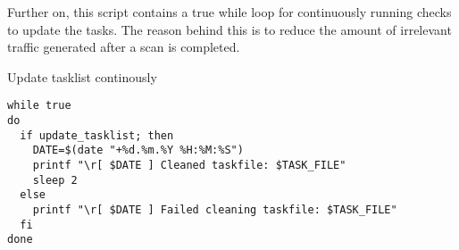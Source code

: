 Further on, this script contains a true while loop for continuously running checks to update the tasks.
The reason behind this is to reduce the amount of irrelevant traffic generated after a scan is completed.


\begin{listing}[!ht]
\caption{Update tasklist continously}
\label{lst:TasklistUpdateContinue}
\begin{verbatim}
while true
do
  if update_tasklist; then
    DATE=$(date "+%d.%m.%Y %H:%M:%S")
    printf "\r[ $DATE ] Cleaned taskfile: $TASK_FILE"
    sleep 2
  else
    printf "\r[ $DATE ] Failed cleaning taskfile: $TASK_FILE"
  fi
done
\end{verbatim}
\end{listing}